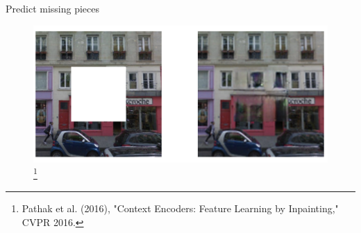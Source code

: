 \begin{frame}[allowframebreaks]{Predict missing pieces}
    \begin{figure}
        \flushleft
        \includegraphics[width=1\linewidth,height=\textheight,keepaspectratio]{images/ssl/slide_17_1_img.png}
        \footnote{Pathak et al. (2016), "Context Encoders: Feature Learning by Inpainting," CVPR 2016.}
    \end{figure}
\end{frame}


